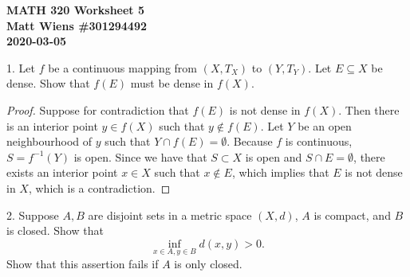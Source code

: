 \documentclass{article}
\begin{document}
\textbf{MATH 320 Worksheet 5} \\
\textbf{Matt Wiens \#301294492} \\
\textbf{2020-03-05}

1. Let $f$ be a continuous mapping from $(X, T_X)$ to $(Y, T_Y)$. Let $E
   \subseteq X$ be dense. Show that $f(E)$ must be dense in $f(X)$.

\begin{proof}

Suppose for contradiction that $f(E)$ is not dense in $f(X)$. Then there
is an interior point $y \in f(X)$ such that $y \not\in f(E)$. Let $Y$ be
an open neighbourhood of $y$ such that $Y \cap f(E) = \emptyset$.
Because $f$ is continuous, $S = f^{-1}(Y)$ is open. Since we have that
$S \subset X$ is open and $S \cap E = \emptyset$, there exists an
interior point $x \in X$ such that $x \not\in E$, which implies that $E$
is not dense in $X$, which is a contradiction.

\end{proof}

\newpage

2. Suppose $A, B$ are disjoint sets in a metric space $(X, d)$, $A$ is
   compact, and $B$ is closed. Show that
%
\begin{equation*}
    \inf_{x \in A, y \in B} d(x, y) > 0
    .
\end{equation*}
%
Show that this assertion fails if $A$ is only closed.
\end{document}
